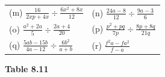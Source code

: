 \begin{enumerate}[noitemsep, label=\textbf{\arabic*}. ]
{{\begin{center}
\begin{tabular}[t]{|l|l|}
        (m) $\frac{16}{2xp+4x}÷\frac{6{x}^{2}+8x}{12}$\hspace{1ex} &
        (n) $\frac{24a-8}{12}÷\frac{9a-3}{6}$\hspace{1ex}%
     \tabularnewline\cline{1-1}\cline{2-2}
        (o) $\frac{{a}^{2}+2a}{5}÷\frac{2a+4}{20}$\hspace{1ex} &
        (p) $\frac{{p}^{2}+pq}{7p}÷\frac{8p+8q}{21q}$\hspace{1ex}%
     \tabularnewline\cline{1-1}\cline{2-2}
        (q) $\frac{5ab-15b}{4a-12}÷\frac{6{b}^{2}}{a+b}$\hspace{1ex} &
        (r) $\frac{{f}^{2}a-f{a}^{2}}{f-a}$%
     \tabularnewline\cline{1-1}\cline{2-2}
    \end{tabular}
      \end{center}
    \begin{center}{\small\bfseries Table 8.11}\end{center}
          }{ %
        \begin{center}

\end{center}}}
\end{enumerate}
